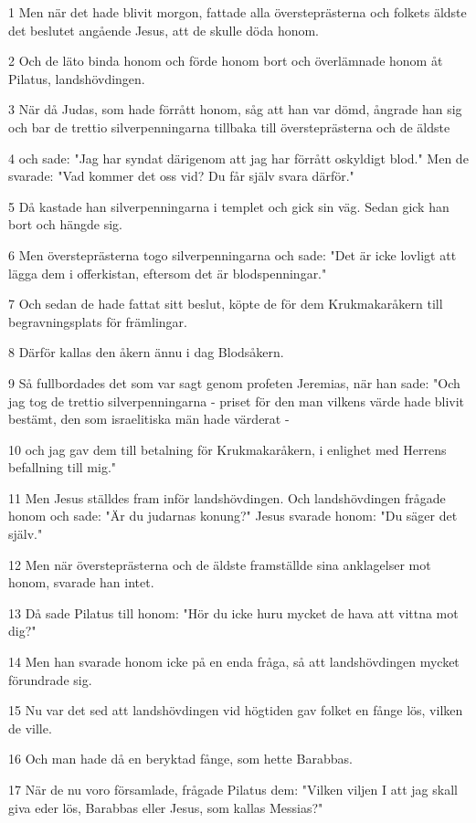 \par 1 Men när det hade blivit morgon, fattade alla översteprästerna och folkets äldste det beslutet angående Jesus, att de skulle döda honom.
\par 2 Och de läto binda honom och förde honom bort och överlämnade honom åt Pilatus, landshövdingen.
\par 3 När då Judas, som hade förrått honom, såg att han var dömd, ångrade han sig och bar de trettio silverpenningarna tillbaka till översteprästerna och de äldste
\par 4 och sade: "Jag har syndat därigenom att jag har förrått oskyldigt blod." Men de svarade: "Vad kommer det oss vid? Du får själv svara därför."
\par 5 Då kastade han silverpenningarna i templet och gick sin väg. Sedan gick han bort och hängde sig.
\par 6 Men översteprästerna togo silverpenningarna och sade: "Det är icke lovligt att lägga dem i offerkistan, eftersom det är blodspenningar."
\par 7 Och sedan de hade fattat sitt beslut, köpte de för dem Krukmakaråkern till begravningsplats för främlingar.
\par 8 Därför kallas den åkern ännu i dag Blodsåkern.
\par 9 Så fullbordades det som var sagt genom profeten Jeremias, när han sade: "Och jag tog de trettio silverpenningarna - priset för den man vilkens värde hade blivit bestämt, den som israelitiska män hade värderat -
\par 10 och jag gav dem till betalning för Krukmakaråkern, i enlighet med Herrens befallning till mig."
\par 11 Men Jesus ställdes fram inför landshövdingen. Och landshövdingen frågade honom och sade: "Är du judarnas konung?" Jesus svarade honom: "Du säger det själv."
\par 12 Men när översteprästerna och de äldste framställde sina anklagelser mot honom, svarade han intet.
\par 13 Då sade Pilatus till honom: "Hör du icke huru mycket de hava att vittna mot dig?"
\par 14 Men han svarade honom icke på en enda fråga, så att landshövdingen mycket förundrade sig.
\par 15 Nu var det sed att landshövdingen vid högtiden gav folket en fånge lös, vilken de ville.
\par 16 Och man hade då en beryktad fånge, som hette Barabbas.
\par 17 När de nu voro församlade, frågade Pilatus dem: "Vilken viljen I att jag skall giva eder lös, Barabbas eller Jesus, som kallas Messias?"
